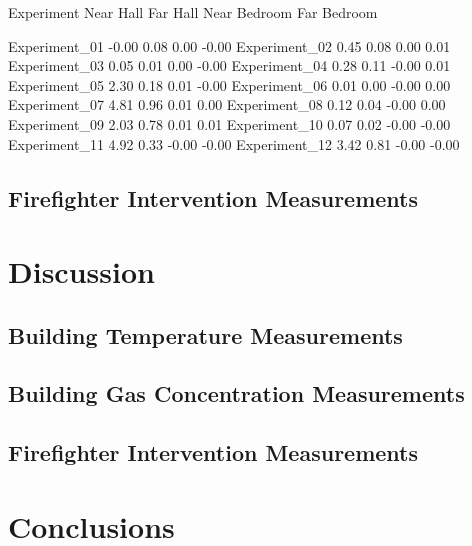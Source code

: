 \documentclass[12pt,oneside]{book}
\begin{document}
Experiment       Near Hall  Far Hall  Near Bedroom  Far Bedroom  \
                                                    
Experiment_01      -0.00      0.08          0.00        -0.00   
Experiment_02       0.45      0.08          0.00         0.01   
Experiment_03       0.05      0.01          0.00        -0.00   
Experiment_04       0.28      0.11         -0.00         0.01   
Experiment_05       2.30      0.18          0.01        -0.00   
Experiment_06       0.01      0.00         -0.00         0.00   
Experiment_07       4.81      0.96          0.01         0.00   
Experiment_08       0.12      0.04         -0.00         0.00   
Experiment_09       2.03      0.78          0.01         0.01   
Experiment_10       0.07      0.02         -0.00        -0.00   
Experiment_11       4.92      0.33         -0.00        -0.00   
Experiment_12       3.42      0.81         -0.00        -0.00   


\subsection{Firefighter Intervention Measurements}

\section{Discussion}


\subsection{Building Temperature Measurements}



\subsection{Building Gas Concentration Measurements}

\subsection{Firefighter Intervention Measurements}

\section{Conclusions}
\end{document}
